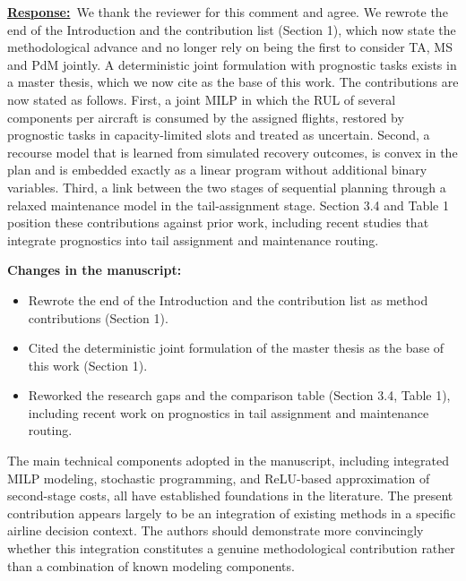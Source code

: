\documentclass{article}
\newcommand{\response}{\vspace{0.1cm}\noindent\underline{\textbf{Response:}}\ }
\newcommand{\changes}{\vspace{0.1cm}\noindent\textbf{Changes in the manuscript:}}
\begin{document}
\response We thank the reviewer for this comment and agree. We rewrote the end of the Introduction and the contribution list (Section 1), which now state the methodological advance and no longer rely on being the first to consider TA, MS and PdM jointly. A deterministic joint formulation with prognostic tasks exists in a master thesis, which we now cite as the base of this work. The contributions are now stated as follows. First, a joint MILP in which the RUL of several components per aircraft is consumed by the assigned flights, restored by prognostic tasks in capacity-limited slots and treated as uncertain. Second, a recourse model that is learned from simulated recovery outcomes, is convex in the plan and is embedded exactly as a linear program without additional binary variables. Third, a link between the two stages of sequential planning through a relaxed maintenance model in the tail-assignment stage. Section 3.4 and Table 1 position these contributions against prior work, including recent studies that integrate prognostics into tail assignment and maintenance routing.

\changes
\begin{itemize}[nosep]
\item Rewrote the end of the Introduction and the contribution list as method contributions (Section 1).
\item Cited the deterministic joint formulation of the master thesis as the base of this work (Section 1).
\item Reworked the research gaps and the comparison table (Section 3.4, Table 1), including recent work on prognostics in tail assignment and maintenance routing.
\end{itemize}

\begin{cmt}{}{}
The main technical components adopted in the manuscript, including integrated MILP modeling, stochastic programming, and ReLU-based approximation of second-stage costs, all have established foundations in the literature. The present contribution appears largely to be an integration of existing methods in a specific airline decision context. The authors should demonstrate more convincingly whether this integration constitutes a genuine methodological contribution rather than a combination of known modeling components.
\end{cmt}
\end{document}
